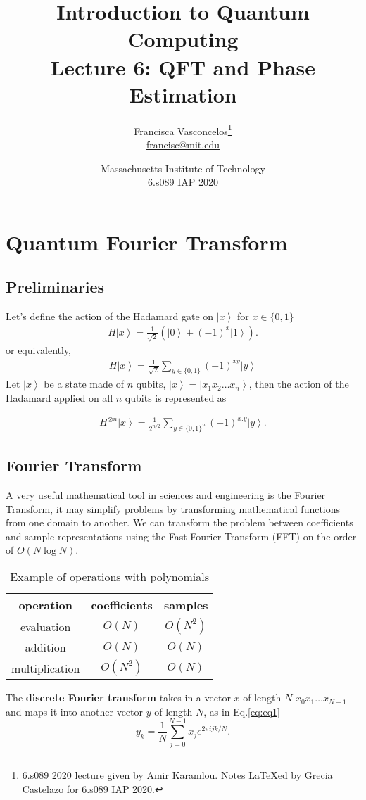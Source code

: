 \documentclass[11pt]{article} %
\author{Francisca Vasconcelos\footnote{6.s089 2020 lecture given by Amir Karamlou. Notes LaTeXed by Grecia Castelazo for 6.s089 IAP 2020.}\\\href{mailto:francisc@mit.edu} {francisc@mit.edu}}
\title{Introduction to Quantum Computing\\Lecture 6: QFT and Phase Estimation}
\date{Massachusetts Institute of Technology\\6.s089 IAP 2020}
\newcommand{\ket}[1]{\left|#1\right\rangle}
\begin{document}
\maketitle
\newpage
\tableofcontents
\newpage

\section{Quantum Fourier Transform}
\subsection{Preliminaries}
Let's define the action of the Hadamard gate on $\ket{x}$ for $x \in \{0,1\}$
\begin{align}
    H\ket{x}=\frac{1}{\sqrt{2}}(\ket{0}+(-1)^x\ket{1}).
\end{align}
or equivalently,
\begin{align}
    H\ket{x}=\frac{1}{\sqrt{2}}\sum_{y \in \{0,1\}}(-1)^{xy}\ket{y}
\end{align}
Let $\ket{x}$ be a state made of $n$ qubits, $\ket{x}=\ket{x_1 x_2 \ldots x_n}$, then the action of the Hadamard applied on all $n$ qubits is represented as

\begin{align}
    H^{\otimes n}\ket{x}=\frac{1}{2^{n/2}}\sum_{y \in \{0,1\}^n}(-1)^{x.y}\ket{y}.
\end{align}

\subsection{Fourier Transform}
A very useful mathematical tool in sciences and engineering is the Fourier Transform, it may simplify problems by transforming mathematical functions from one domain to another. We can transform the problem between coefficients and sample representations using the Fast Fourier Transform (FFT) on the order of $O(N\log{N})$.

\begin{table}[!htbp]
    \centering
    \begin{tabular}{c|c c}
        operation & coefficients & samples\\\hline
        evaluation & $O(N)$ & $O(N^2)$\\
        addition & $O(N)$ & $O(N)$\\
        multiplication & $O(N^2)$ & $O(N)$\\
    \end{tabular}
    \caption{Example of operations with polynomials}
\label{table:table1}
\end{table}
The {\bf discrete Fourier transform} takes in a vector $x$ of length $N$ $x_0 x_1 \ldots x_{N-1}$ and maps it into another vector $y$ of length $N$, as in Eq.\ref{eq:eq1} 
\begin{equation}
 y_k=\frac{1}{N}\sum_{j=0}^{N-1}x_j e^{2\pi ijk/N}.
\label{eq:eq1}   
\end{equation}
\end{document}
